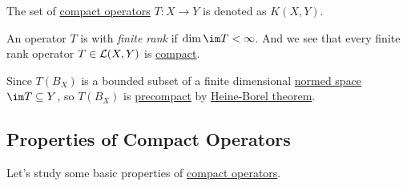 \begin{notation}
	The set of \hyperref[def:compact-op]{compact operators} \(T\colon X\to Y\) is denoted as \(K(X, Y)\).
\end{notation}

\begin{remark}
	An operator \(T\) is with \emph{finite rank} if \(\dim \im T < \infty \). And we see that every finite rank operator \(T\in \mathcal{\MakeUppercase{l}} (X, Y)\) is \hyperref[def:compact-op]{compact}.
\end{remark}
\begin{explanation}
	Since \(T(B_X)\) 	is a bounded subset of a finite dimensional \hyperref[def:normed-vector-space]{normed space} \(\im T \subseteq Y\), so \(T(B_X)\) is \hyperref[def:precompact]{precompact} by \hyperref[thm:Heine-Borel]{Heine-Borel theorem}.
\end{explanation}

\subsection{Properties of Compact Operators}
Let's study some basic properties of \hyperref[def:compact-op]{compact operators}.

